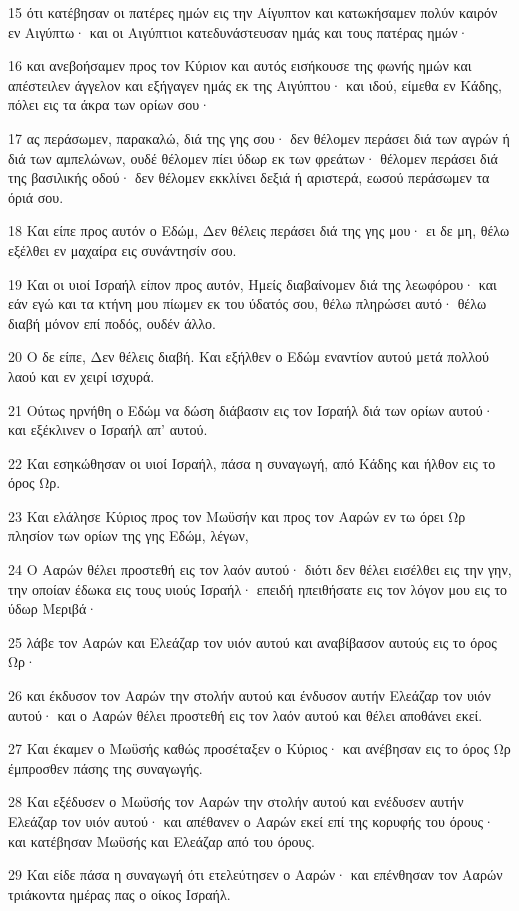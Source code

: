 \par 15 ότι κατέβησαν οι πατέρες ημών εις την Αίγυπτον και κατωκήσαμεν πολύν καιρόν εν Αιγύπτω· και οι Αιγύπτιοι κατεδυνάστευσαν ημάς και τους πατέρας ημών·
\par 16 και ανεβοήσαμεν προς τον Κύριον και αυτός εισήκουσε της φωνής ημών και απέστειλεν άγγελον και εξήγαγεν ημάς εκ της Αιγύπτου· και ιδού, είμεθα εν Κάδης, πόλει εις τα άκρα των ορίων σου·
\par 17 ας περάσωμεν, παρακαλώ, διά της γης σου· δεν θέλομεν περάσει διά των αγρών ή διά των αμπελώνων, ουδέ θέλομεν πίει ύδωρ εκ των φρεάτων· θέλομεν περάσει διά της βασιλικής οδού· δεν θέλομεν εκκλίνει δεξιά ή αριστερά, εωσού περάσωμεν τα όριά σου.
\par 18 Και είπε προς αυτόν ο Εδώμ, Δεν θέλεις περάσει διά της γης μου· ει δε μη, θέλω εξέλθει εν μαχαίρα εις συνάντησίν σου.
\par 19 Και οι υιοί Ισραήλ είπον προς αυτόν, Ημείς διαβαίνομεν διά της λεωφόρου· και εάν εγώ και τα κτήνη μου πίωμεν εκ του ύδατός σου, θέλω πληρώσει αυτό· θέλω διαβή μόνον επί ποδός, ουδέν άλλο.
\par 20 Ο δε είπε, Δεν θέλεις διαβή. Και εξήλθεν ο Εδώμ εναντίον αυτού μετά πολλού λαού και εν χειρί ισχυρά.
\par 21 Ούτως ηρνήθη ο Εδώμ να δώση διάβασιν εις τον Ισραήλ διά των ορίων αυτού· και εξέκλινεν ο Ισραήλ απ' αυτού.
\par 22 Και εσηκώθησαν οι υιοί Ισραήλ, πάσα η συναγωγή, από Κάδης και ήλθον εις το όρος Ωρ.
\par 23 Και ελάλησε Κύριος προς τον Μωϋσήν και προς τον Ααρών εν τω όρει Ωρ πλησίον των ορίων της γης Εδώμ, λέγων,
\par 24 Ο Ααρών θέλει προστεθή εις τον λαόν αυτού· διότι δεν θέλει εισέλθει εις την γην, την οποίαν έδωκα εις τους υιούς Ισραήλ· επειδή ηπειθήσατε εις τον λόγον μου εις το ύδωρ Μεριβά·
\par 25 λάβε τον Ααρών και Ελεάζαρ τον υιόν αυτού και αναβίβασον αυτούς εις το όρος Ωρ·
\par 26 και έκδυσον τον Ααρών την στολήν αυτού και ένδυσον αυτήν Ελεάζαρ τον υιόν αυτού· και ο Ααρών θέλει προστεθή εις τον λαόν αυτού και θέλει αποθάνει εκεί.
\par 27 Και έκαμεν ο Μωϋσής καθώς προσέταξεν ο Κύριος· και ανέβησαν εις το όρος Ωρ έμπροσθεν πάσης της συναγωγής.
\par 28 Και εξέδυσεν ο Μωϋσής τον Ααρών την στολήν αυτού και ενέδυσεν αυτήν Ελεάζαρ τον υιόν αυτού· και απέθανεν ο Ααρών εκεί επί της κορυφής του όρους· και κατέβησαν Μωϋσής και Ελεάζαρ από του όρους.
\par 29 Και είδε πάσα η συναγωγή ότι ετελεύτησεν ο Ααρών· και επένθησαν τον Ααρών τριάκοντα ημέρας πας ο οίκος Ισραήλ.

